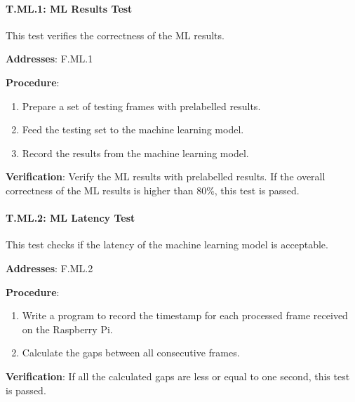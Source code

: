 \paragraph{T.ML.1: ML Results Test}

This test verifies the correctness of the ML results.

\textbf{Addresses}: F.ML.1

\textbf{Procedure}:
\begin{enumerate}[noitemsep]
    \item Prepare a set of testing frames with prelabelled results.
    \item Feed the testing set to the machine learning model.
    \item Record the results from the machine learning model.
\end{enumerate}

\textbf{Verification}: 
Verify the ML results with prelabelled results. If the overall correctness of the ML results is higher than 80\%, this test is passed.

%

\paragraph{T.ML.2: ML Latency Test}

This test checks if the latency of the machine learning model is acceptable.

\textbf{Addresses}: F.ML.2

\textbf{Procedure}:
\begin{enumerate}[noitemsep]
    \item Write a program to record the timestamp for each processed frame received on the Raspberry Pi.
    \item Calculate the gaps between all consecutive frames.
\end{enumerate}

\textbf{Verification}: 
If all the calculated gaps are less or equal to one second, this test is passed.